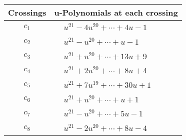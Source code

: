 \documentclass[1p]{elsarticle_modified}
\theoremstyle{definition}
\begin{document}
\begin{tabular}{m{50pt}|m{274pt}}
Crossings & \hspace{64pt}u-Polynomials at each crossing \\
\hline $$\begin{aligned}c_{1}\end{aligned}$$&$\begin{aligned}
&u^{21}-4 u^{20}+\cdots+4 u-1
\end{aligned}$\\
\hline $$\begin{aligned}c_{2}\end{aligned}$$&$\begin{aligned}
&u^{21}- u^{20}+\cdots+u-1
\end{aligned}$\\
\hline $$\begin{aligned}c_{3}\end{aligned}$$&$\begin{aligned}
&u^{21}+u^{20}+\cdots+13 u+9
\end{aligned}$\\
\hline $$\begin{aligned}c_{4}\end{aligned}$$&$\begin{aligned}
&u^{21}+2 u^{20}+\cdots+8 u+4
\end{aligned}$\\
\hline $$\begin{aligned}c_{5}\end{aligned}$$&$\begin{aligned}
&u^{21}+7 u^{19}+\cdots+30 u+1
\end{aligned}$\\
\hline $$\begin{aligned}c_{6}\end{aligned}$$&$\begin{aligned}
&u^{21}+u^{20}+\cdots+u+1
\end{aligned}$\\
\hline $$\begin{aligned}c_{7}\end{aligned}$$&$\begin{aligned}
&u^{21}- u^{20}+\cdots+5 u-1
\end{aligned}$\\
\hline $$\begin{aligned}c_{8}\end{aligned}$$&$\begin{aligned}
&u^{21}-2 u^{20}+\cdots+8 u-4
\end{aligned}$\\

\end{tabular}
\end{document}
